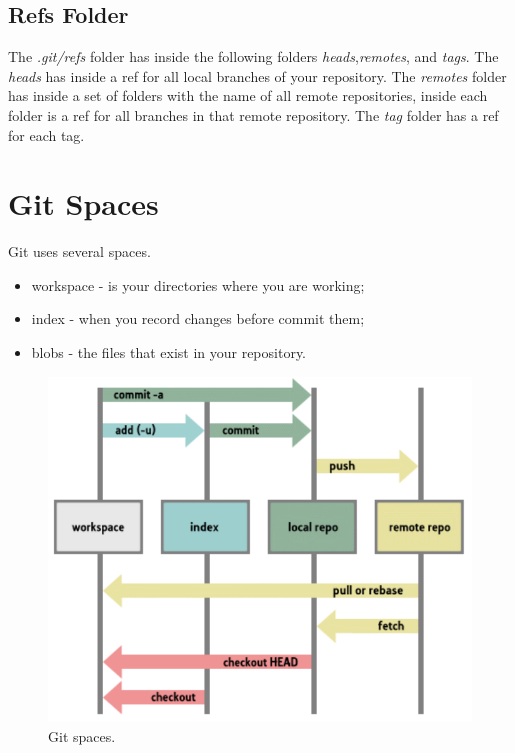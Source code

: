 \subsection{Refs Folder}

The \emph{.git/refs} folder has inside the following folders \emph{heads},\emph{remotes}, and \emph{tags}.
The \emph{heads} has inside a ref for all local branches of your repository.
The \emph{remotes} folder has inside a set of folders with the name of all remote repositories, inside each folder is a ref for all branches in that remote repository.
The \emph{tag} folder has a ref for each tag.

\section{Git Spaces}

Git uses several spaces.

\begin{itemize}
    \item[\textbullet] {workspace - is your directories where you are working;}
    \item[\textbullet] {index - when you record changes before commit them;}
    \item[\textbullet] {blobs - the files that exist in your repository.}
\end{itemize}



\begin{figure}[h!]
  \centering
  \includegraphics[width=12cm]{../chapter/git/figures/git_spaces.png}
  \caption{Git spaces.}\label{git_spaces}
\end{figure}



